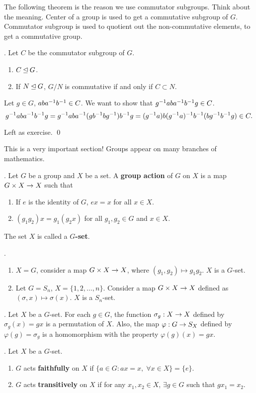 The following theorem is the reason we use commutator subgroups. Think about the meaning. Center of a group is used to get a commutative subgroup of \(G\). Commutator subgroup is used to quotient out the non-commutative elements, to get a commutative group.

\thm. Let \(C\) be the commutator subgroup of \(G\).
\begin{enumerate}
    \item \(C \unlhd G\).
    \item If \(N \unlhd G\), \(G/N\) is commutative if and only if \(C \subset N\).
\end{enumerate}

\pf {} Let \(g \in G\), \(aba^{-1} b^{-1} \in C\). We want to show that \(g^{-1} aba^{-1} b^{-1} g \in C\).
\[
    g^{-1} aba^{-1} b^{-1} g = g^{-1} aba^{-1} (gb^{-1} b g^{-1})b^{-1} g = (g^{-1} a)b(g^{-1} a)^{-1} b^{-1} (bg^{-1} b^{-1} g) \in C.
\]

 Left as exercise. \qed

\pagebreak


This is a very important section! Groups appear on many branches of mathematics.

.  Let \(G\) be a group and \(X\) be a set. A \textbf{group action} of \(G\) on \(X\) is a map \(G \times X \rightarrow X\) such that
\begin{enumerate}
    \item If \(e\) is the identity of \(G\), \(ex = x\) for all \(x \in X\).
    \item \((g_1g_2)x = g_1(g_2 x)\) for all \(g_1, g_2 \in G\) and \(x \in X\).
\end{enumerate}
The set \(X\) is called a \textbf{\(G\)-set}.

\ex.
\begin{enumerate}
    \item \(X = G\), consider a map \(G \times X \rightarrow X\), where \((g_1, g_2) \mapsto g_1 g_2\). \(X\) is a \(G\)-set.
    \item Let \(G = S_n\), \(X = \{1, 2, \dots, n\}\). Consider a map \(G \times X \rightarrow X\) defined as \((\sigma, x) \mapsto \sigma(x)\). \(X\) is a \(S_n\)-set.
\end{enumerate}

\thm. Let \(X\) be a \(G\)-set. For each \(g \in G\), the function \(\sigma_g: X \rightarrow X\) defined by \(\sigma_g(x) = gx\) is a permutation of \(X\). Also, the map \(\varphi : G \rightarrow S_X\) defined by \(\varphi(g) = \sigma_g\) is a homomorphism with the property \(\varphi(g)(x) = gx\).

. Let \(X\) be a \(G\)-set.
\begin{enumerate}
    \item \(G\) acts \textbf{faithfully} on \(X\) if \(\{a \in G : ax = x, \; \forall x \in X\} = \{e\}\).
    \item \(G\) acts \textbf{transitively} on \(X\) if for any \(x_1, x_2 \in X\), \(\exists g \in G\) such that \(g x_1 = x_2\).
\end{enumerate}

\smallskip
